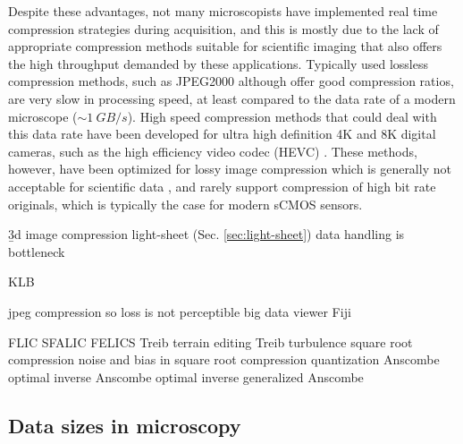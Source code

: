   Despite these advantages, not many microscopists have implemented real time compression strategies during acquisition, and this is mostly due to the lack of appropriate compression methods suitable for scientific imaging that also offers the high throughput demanded by these applications. Typically used lossless compression methods, such as JPEG2000 \cite{adams_jpeg-2000_2001} although offer good compression ratios, are very slow in processing speed, at least compared to the data rate of a modern microscope ($\sim \SI{1}{GB/s}$). High speed compression methods that could deal with this data rate have been developed for ultra high definition 4K and 8K digital cameras, such as the high efficiency video codec (HEVC) \cite{international_telecommunications_union_h.265_2016}. These methods, however, have been optimized for lossy image compression which is generally not acceptable for scientific data \cite{cromey_digital_2013}, and rarely support compression of high bit rate originals, which is typically the case for modern sCMOS sensors.

  \b3d image compression
  light-sheet (Sec. \ref{sec:light-sheet})
  data handling is bottleneck 

  KLB \cite{amat_efficient_2015}

  jpeg compression so loss is not perceptible \cite{sayood_introduction_2012}
  big data viewer \cite{pietzsch_bigdataviewer:_2015}
  Fiji \cite{schindelin_fiji:_2012}

  FLIC \cite{wang_fast_2012}
  SFALIC \cite{starosolski_simple_2007}
  FELICS \cite{howard_fast_1993}
  Treib terrain editing \cite{treib_interactive_2012}
  Treib turbulence \cite{treib_turbulence_2012}
  square root compression \cite{gowen_square_2003}
  noise and bias in square root compression \cite{bernstein_noise_2010}
  quantization \cite{gray_quantization_1998}
  Anscombe \cite{anscombe_transformation_1948}
  optimal inverse Anscombe \cite{makitalo_optimal_2011,makitalo_closed-form_2011}
  optimal inverse generalized Anscombe \cite{makitalo_optimal_2013}



  \subsection{Data sizes in microscopy}

